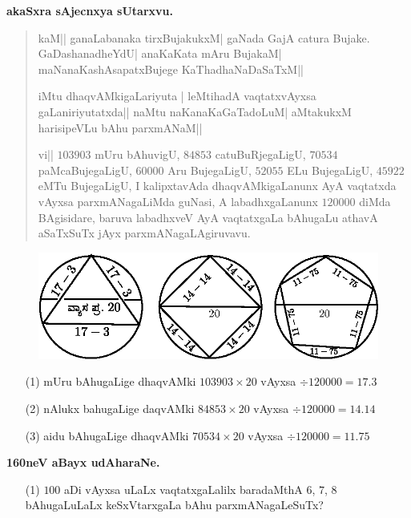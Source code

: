 \medskip
\begin{center}
{\large\bf akaSxra sAjecnxya sUtarxvu.}
\end{center}

\begin{verse}
kaM|| ganaLabanaka tirxBujakukxM| gaNada GajA catura
Bujake. GaDashanadheYdU| anaKaKata mAru BujakaM|
maNanaKashAsapatxBujege KaThadhaNaDaSaTxM||

iMtu dhaqvAMkigaLariyuta | leMtihadA vaqtatxvAyxsa gaLaniriyutatxda||
naMtu naKanaKaGaTadoLuM| aMtakukxM harisipeVLu bAhu parxmANaM||

vi|| $103903$ mUru bAhuvigU, $84853$ catuBuRjegaLigU, $70534$
paMcaBujegaLigU, $60000$ Aru BujegaLigU, $52055$ ELu BujegaLigU,
$45922$ eMTu BujegaLigU, I kalipxtavAda dhaqvAMkigaLanunx AyA
vaqtatxda vAyxsa parxmANagaLiMda guNasi, A labadhxgaLanunx $120000$
diMda BAgisidare, baruva labadhxveV AyA vaqtatxgaLa bAhugaLu athavA
aSaTxSuTx jAyx parxmANagaLAgiruvavu.
\end{verse}

\begin{figure}[H]
\centering
\includegraphics{figure/fig35.eps}
\end{figure}

\begin{itemize}
\item[\rm(1)] mUru bAhugaLige dhaqvAMki $103903\times 20$ vAyxsa $\div
120000=17.3$ 

\item[\rm(2)] nAlukx bahugaLige daqvAMki $84853\times 20$ vAyxsa $\div
120000=14.14$ 

\item[\rm(3)] aidu bAhugaLige dhaqvAMki $70534\times 20$ vAyxsa $\div
120000=11.75$ 
\end{itemize}

\medskip

\begin{center}
{\large\bf 160neV aBayx udAharaNe.}
\end{center}

\begin{itemize}
\item[\rm(1)] $100$ aDi vAyxsa uLaLx vaqtatxgaLalilx baradaMthA $6$,
$7$, $8$ bAhugaLuLaLx keSxVtarxgaLa bAhu parxmANagaLeSuTx?
\end{itemize}

